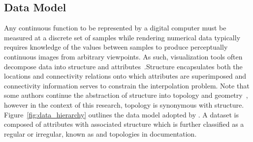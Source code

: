 \subsection{Data Model}
Any continuous function to be represented by a digital computer must
be measured at a discrete set of samples while rendering numerical
data typically requires knowledge of the values between samples to
produce perceptually continuous images from arbitrary viewpoints. As
such, visualization tools often decompose data into structure and
attributes~\cite{vtk}.Structure encapsulates both the locations and
connectivity relations onto which attributes are superimposed and
connectivity information serves to constrain the interpolation
problem. Note that some authors continue the abstraction of structure
into topology and geometry~\cite{weiler}, however in the context of
this research, topology is synonymous with
structure. Figure~\ref{fig:data_hierarchy} outlines the data model
adopted by \sciwms{}. A dataset is composed of attributes with
associated structure which is further classified as a regular or
irregular, known as {\bf \cgrid{} } and {\bf \ugrid{}} topologies
in \sciwms{} documentation.
